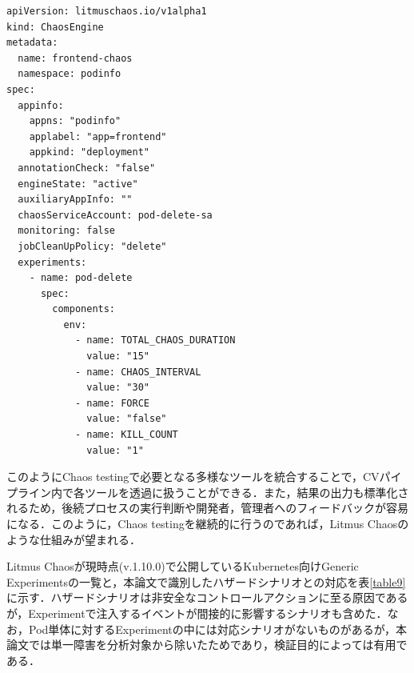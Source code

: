 \documentclass[12pt,a4j]{ujreport}
\begin{document}
\newpage
\begin{lstlisting}[caption=Litmus Chaosの実行定義(Engine),label=sc4]
apiVersion: litmuschaos.io/v1alpha1
kind: ChaosEngine
metadata:
  name: frontend-chaos
  namespace: podinfo
spec:
  appinfo:
    appns: "podinfo"
    applabel: "app=frontend"
    appkind: "deployment"
  annotationCheck: "false"
  engineState: "active"
  auxiliaryAppInfo: ""
  chaosServiceAccount: pod-delete-sa
  monitoring: false
  jobCleanUpPolicy: "delete"
  experiments:
    - name: pod-delete
      spec:
        components:
          env:
            - name: TOTAL_CHAOS_DURATION
              value: "15"
            - name: CHAOS_INTERVAL
              value: "30"
            - name: FORCE
              value: "false"
            - name: KILL_COUNT
              value: "1"
\end{lstlisting}

このようにChaos testingで必要となる多様なツールを統合することで，CVパイプライン内で各ツールを透過に扱うことができる．また，結果の出力も標準化されるため，後続プロセスの実行判断や開発者，管理者へのフィードバックが容易になる．このように，Chaos testingを継続的に行うのであれば，Litmus Chaosのような仕組みが望まれる．

Litmus Chaosが現時点(v.1.10.0)で公開しているKubernetes向けGeneric Experimentsの一覧と，本論文で識別したハザードシナリオとの対応を表\ref{table9}に示す．ハザードシナリオは非安全なコントロールアクションに至る原因であるが，Experimentで注入するイベントが間接的に影響するシナリオも含めた．なお，Pod単体に対するExperimentの中には対応シナリオがないものがあるが，本論文では単一障害を分析対象から除いたためであり，検証目的によっては有用である．
\end{document}
